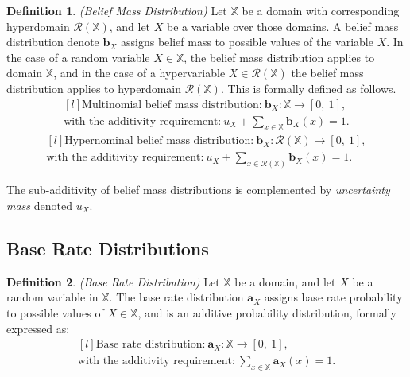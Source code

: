 \documentclass[a4paper,12pt]{article}
\theoremstyle{definition}
\newtheorem{definition}{Definition}[section]
\numberwithin{equation}{section}
\begin{document}
\begin{definition}
	\emph{(Belief Mass Distribution)} Let $\mathbb{X}$ be a domain with corresponding hyperdomain $\mathcal{R}(\mathbb{X})$, and let $X$ be a variable over those domains. A belief mass distribution denote $\mathbf{b}_X$ assigns belief mass to possible values of the variable $X$. In the case of a random variable $X \in \mathbb{X}$, the belief mass distribution applies to domain $\mathbb{X}$, and in the case of a hypervariable $X \in \mathcal{R}(\mathbb{X})$ the belief mass distribution applies to hyperdomain $\mathcal{R}(\mathbb{X})$. This is formally defined as follows.
	\begin{equation}
		\begin{matrix*}[l]
			\text{Multinomial belief mass distribution:}\ \mathbf{b}_X : \mathbb{X} \rightarrow [0,\ 1], \\
			\text{with the additivity requirement:}\ u_X + \sum_{x \in \mathbb{X}} \mathbf{b}_X(x) = 1\text{.}
		\end{matrix*}
	\end{equation}
	\begin{equation}
		\begin{matrix*}[l]
			\text{Hypernominal belief mass distribution:}\ \mathbf{b}_X : \mathcal{R}(\mathbb{X}) \rightarrow [0,\ 1], \\
			\text{with the additivity requirement:}\ u_X + \sum_{x \in \mathcal{R}(\mathbb{X})} \mathbf{b}_X(x) = 1\text{.}
		\end{matrix*}
	\end{equation}
\end{definition}

The sub-additivity of belief mass distributions is complemented by \emph{uncertainty mass} denoted $u_X$.

\subsection{Base Rate Distributions}

\begin{definition}\label{def:base_rate_distribution}
	\emph{(Base Rate Distribution)} Let $\mathbb{X}$ be a domain, and let $X$ be a random variable in $\mathbb{X}$. The base rate distribution $\mathbf{a}_X$ assigns base rate probability to possible values of $X \in \mathbb{X}$, and is an additive probability distribution, formally expressed as:
	\begin{equation}
		\begin{matrix*}[l]
			\text{Base rate distribution:}\ \mathbf{a}_X : \mathbb{X} \rightarrow [0,\ 1], \\
			\text{with the additivity requirement:}\ \sum_{x \in \mathbb{X}} \mathbf{a}_X(x) = 1\text{.}
		\end{matrix*}
	\end{equation}
\end{definition}
\end{document}
